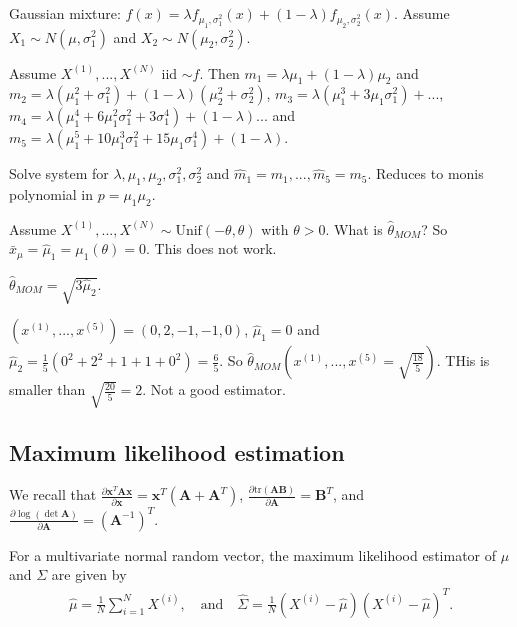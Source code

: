 \documentclass[a4paper, 11pt]{article}
\begin{document}
Gaussian mixture: \( f(x) = \lambda f_{\mu_1, \sigma_1^2}(x) + (1 - \lambda) f_{\mu_2,  \sigma_2^2} (x) \). Assume \( X_1 \sim N(\mu, \sigma_1^2) \) and \( X_2 \sim N(\mu_2, \sigma^2_2) \).

Assume \( X^{(1)}, ..., X^{(N)} \) iid \( \sim f \). Then \( m_1 = \lambda \mu_1 + ( 1 - \lambda) \mu_2 \) and \( m_2 = \lambda (\mu_1^2 + \sigma_1^2) + (1 - \lambda)(\mu_2^2 + \sigma_2^2) \), \( m_3 = \lambda(\mu_1^3 + 3 \mu_1 \sigma_1^2)  + ...\), \( m_4 = \lambda(\mu_1^4 + 6 \mu_1^2 \sigma_1^2 + 3 \sigma_1^4) + (1 - \lambda)... \) and \( m_5 = \lambda(\mu_1^5 + 10 \mu_1^3 \sigma_1^2 + 15 \mu_1 \sigma_1^4) + (1- \lambda) \).

Solve system for \( \lambda, \mu_1, \mu_2, \sigma_1^2, \sigma_2^2 \) and \( \hat m_1 = m_1, ..., \hat m_5 = m_5 \). Reduces to monis polynomial in \( p = \mu_1 \mu_2 \).

\begin{eg}
  Assume \( X^{(1)}, ..., X^{(N)} \sim \mathrm{Unif}(-\theta, \theta)\)  with \( \theta > 0 \). What is \( \hat \theta_{MOM} \)? So \( \bar x_\mu = \hat \mu_1 = \mu_1(\theta) = 0 \). This does not work.

  \( \hat \theta_{MOM} = \sqrt{3 \hat \mu_2} \).
\end{eg}

\begin{eg}
  \( (x^{(1)}, ..., x^{(5)}) = (0,2,-1,-1, 0)  \), \( \hat \mu_1 = 0 \) and \( \hat \mu_2 = \frac{1}{5} (0^2 + 2^2 + 1 + 1 + 0^2) = \frac{6}{5} \). So \( \hat \theta_{MOM}(x^{(1)}, ..., x^{(5)} = \sqrt{\frac{18}{5}}) \). THis is smaller than \( \sqrt{\frac{20}{5}} = 2 \). Not a good estimator.
\end{eg}

\subsection{Maximum likelihood estimation}

We recall that \( \frac{\partial \mathbf x^T \mathbf A \mathbf x}{\partial \mathbf x} = \mathbf x^T (\mathbf A + \mathbf A^T) \), \( \frac{\partial \mathrm{tr}(\mathbf A \mathbf B)}{\partial \mathbf A} = \mathbf B^T \), and \( \frac{\partial \log(\det \mathbf A)}{\partial \mathbf A} = (\mathbf A^{-1})^T \).

\begin{prop}\label{mle:multivariate-normal}
  For a multivariate normal random vector, the maximum likelihood estimator of \( \mu \) and \( \Sigma \) are given by 
  \begin{align*}
    \hat \mu = \frac{1}{N} \sum_{i=1}^N X^{(i)}, \quad \text{and} \quad \hat \Sigma = \frac{1}{N}(X^{(i)} - \hat \mu)(X^{(i)} - \hat \mu)^T.
  \end{align*}
\end{prop}
\end{document}
